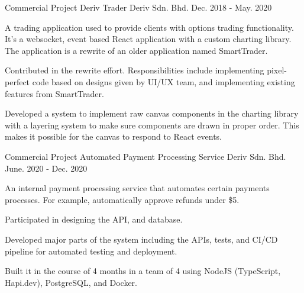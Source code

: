 

\begin{cventries}

  \cventry
    {Commercial Project} %
    {Deriv Trader} %
    {Deriv Sdn. Bhd.} %
    {Dec. 2018 - May. 2020} %
    {
      \begin{cvitems} %
        \item {A trading application used to provide clients with options trading functionality. It's a websocket, event based React application with a custom charting library. The application is a rewrite of an older application named SmartTrader.}
        \item {Contributed in the rewrite effort. Responsibilities include implementing pixel-perfect code based on designs given by UI/UX team, and implementing existing features from SmartTrader.}
        \item {Developed a system to implement raw canvas components in the charting library with a layering system to make sure components are drawn in proper order. This makes it possible for the canvas to respond to React events.}
      \end{cvitems}
    }

  \cventry
    {Commercial Project} %
    {Automated Payment Processing Service} %
    {Deriv Sdn. Bhd.} %
    {June. 2020 - Dec. 2020} %
    {
      \begin{cvitems} %
        \item {An internal payment processing service that automates certain payments processes. For example, automatically approve refunds under \$5.}
        \item {Participated in designing the API, and database.}
        \item {Developed major parts of the system including the APIs, tests, and CI/CD pipeline for automated testing and deployment.}
        \item {Built it in the course of 4 months in a team of 4 using NodeJS (TypeScript, Hapi.dev), PostgreSQL, and Docker.}
      \end{cvitems}
    }



\end{cventries}
